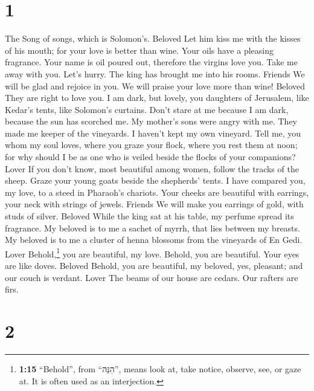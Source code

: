 \hypertarget{section}{%
\section{1}\label{section}}

 The Song of songs, which is Solomon's. Beloved
 Let him kiss me with the kisses of his mouth; for your
love is better than wine.  Your oils have a pleasing
fragrance. Your name is oil poured out, therefore the virgins love you.
 Take me away with you. Let's hurry. The king has brought
me into his rooms. Friends We will be glad and rejoice in you. We will
praise your love more than wine! Beloved They are right to love you.
 I am dark, but lovely, you daughters of Jerusalem, like
Kedar's tents, like Solomon's curtains.  Don't stare at me
because I am dark, because the sun has scorched me. My mother's sons
were angry with me. They made me keeper of the vineyards. I haven't kept
my own vineyard.  Tell me, you whom my soul loves, where
you graze your flock, where you rest them at noon; for why should I be
as one who is veiled beside the flocks of your companions? Lover
 If you don't know, most beautiful among women, follow the
tracks of the sheep. Graze your young goats beside the shepherds' tents.
 I have compared you, my love, to a steed in Pharaoh's
chariots.  Your cheeks are beautiful with earrings, your
neck with strings of jewels. Friends  We will make you
earrings of gold, with studs of silver. Beloved  While
the king sat at his table, my perfume spread its fragrance.
 My beloved is to me a sachet of myrrh, that lies between
my breasts.  My beloved is to me a cluster of henna
blossoms from the vineyards of En Gedi. Lover 
Behold,\footnote{\textbf{1:15} ``Behold'', from ``הִנֵּה'', means look
  at, take notice, observe, see, or gaze at. It is often used as an
  interjection.} you are beautiful, my love. Behold, you are beautiful.
Your eyes are like doves. Beloved  Behold, you are
beautiful, my beloved, yes, pleasant; and our couch is verdant. Lover
 The beams of our house are cedars. Our rafters are firs.

\hypertarget{section-1}{%
\section{2}\label{section-1}}

